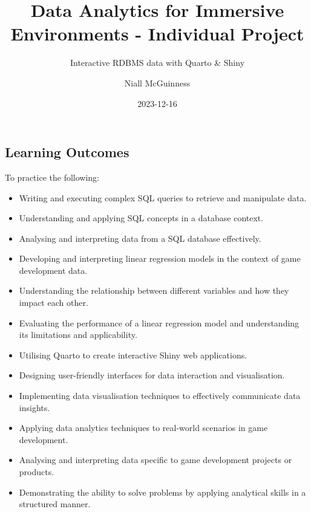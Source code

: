 \documentclass[
  letterpaper,
  DIV=11,
  numbers=noendperiod]{scrartcl}
\title{Data Analytics for Immersive Environments - Individual Project}
\subtitle{Interactive RDBMS data with Quarto \& Shiny}
\author{Niall McGuinness}
\date{2023-12-16}
\providecommand{\tightlist}{%
  \setlength{\itemsep}{0pt}\setlength{\parskip}{0pt}}\usepackage{longtable,booktabs,array}
\renewcommand*\contentsname{Table of contents}
\newcommand\contentsname{Table of contents}
\begin{document}
\maketitle
\ifdefined\Shaded\renewenvironment{Shaded}{\begin{tcolorbox}[boxrule=0pt, breakable, borderline west={3pt}{0pt}{shadecolor}, frame hidden, sharp corners, interior hidden, enhanced]}{\end{tcolorbox}}\fi

\renewcommand*\contentsname{Table of contents}
{
\hypersetup{linkcolor=}
\setcounter{tocdepth}{3}
\tableofcontents
}
\hypertarget{learning-outcomes}{%
\subsection{Learning Outcomes}\label{learning-outcomes}}

To practice the following:

\begin{itemize}
\tightlist
\item
  Writing and executing complex SQL queries to retrieve and manipulate
  data.
\item
  Understanding and applying SQL concepts in a database context.
\item
  Analysing and interpreting data from a SQL database effectively.
\item
  Developing and interpreting linear regression models in the context of
  game development data.
\item
  Understanding the relationship between different variables and how
  they impact each other.
\item
  Evaluating the performance of a linear regression model and
  understanding its limitations and applicability.
\item
  Utilising Quarto to create interactive Shiny web applications.
\item
  Designing user-friendly interfaces for data interaction and
  visualisation.
\item
  Implementing data visualisation techniques to effectively communicate
  data insights.
\item
  Applying data analytics techniques to real-world scenarios in game
  development.
\item
  Analysing and interpreting data specific to game development projects
  or products.
\item
  Demonstrating the ability to solve problems by applying analytical
  skills in a structured manner.
\end{itemize}
\end{document}
